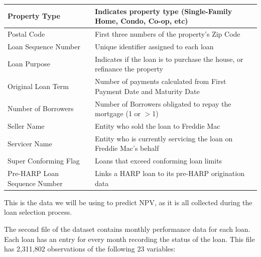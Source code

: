 \documentclass[12 pt]{uncw_thesis}
\theoremstyle{plain}
\theoremstyle{remark}
\theoremstyle{definition}
\begin{document}
\begin{center}
\begin{longtable}{ |M{5.5cm}|M{8.75cm}| }
		\hline
		Property Type & Indicates property type (Single-Family Home, Condo, Co-op, etc) \\
		\hline
		Postal Code & First three numbers of the property's Zip Code\\
		\hline
		Loan Sequence Number & Unique identifier assigned to each loan \\
		\hline
		Loan Purpose & Indicates if the loan is to purchase the house, or refinance the property\\
		\hline
		Original Loan Term & Number of payments calculated from First Payment Date and Maturity Date \\
		\hline
		Number of Borrowers & Number of Borrowers obligated to repay the mortgage (1 or $>$1)\\
		\hline
		Seller Name & Entity who sold the loan to Freddie Mac\\
		\hline
		Servicer Name & Entity who is currently servicing the loan on Freddie Mac's behalf\\
		\hline
		Super Conforming Flag & Loans that exceed conforming loan limits\\
		\hline
		Pre-HARP Loan Sequence Number & Links a HARP loan to its pre-HARP origination data\\
		\hline
	\end{longtable}
\end{center}
\begin{flushleft}
This is the data we will be using to predict NPV, as it is all collected during the loan selection process.
\end{flushleft}
The second file of the dataset contains monthly performance data for each loan. Each loan has an entry for every month recording the status of the loan. This file has 2,311,802 observations of the following 23 variables:
\end{document}
